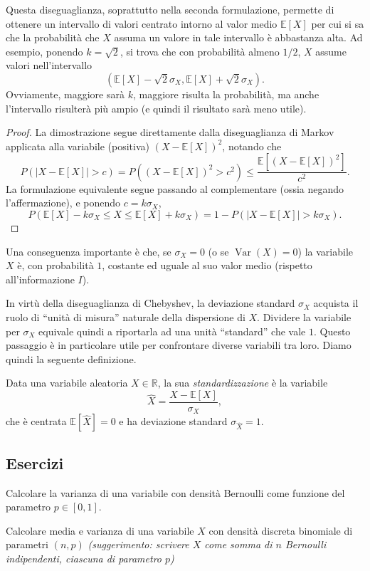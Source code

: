 \documentclass[
  italian,
  letterpaper,
]{book}
\newcommand{\bra}[1]{\left( #1 \right)}
\newcommand{\sqa}[1]{\left[ #1 \right]}
\newcommand{\R}{\mathbb{R}}
\newcommand{\E}[1]{\mathbb{E}\sqa{#1}}
\newcommand{\Var}[1]{\operatorname{Var}\bra{#1}}
\theoremstyle{definition}
\theoremstyle{remark}
\begin{document}
Questa diseguaglianza, soprattutto nella seconda formulazione, permette
di ottenere un intervallo di valori centrato intorno al valor medio
\(\E{X}\) per cui si sa che la probabilità che \(X\) assuma un valore in
tale intervallo è abbastanza alta. Ad esempio, ponendo \(k=\sqrt{2}\),
si trova che con probabilità almeno \(1/2\), \(X\) assume valori
nell'intervallo
\[ ( \E{X}- \sqrt{2} \sigma_X,  \E{X}+ \sqrt{2} \sigma_X).\] Ovviamente,
maggiore sarà \(k\), maggiore risulta la probabilità, ma anche
l'intervallo risulterà più ampio (e quindi il risultato sarà meno
utile).

\begin{proof}
La dimostrazione segue direttamente dalla diseguaglianza di Markov
applicata alla variabile (positiva) \((X-\E{X})^2\), notando che
\[ P( |X- \E{X}| > c ) =  P( (X- \E{X})^2 > c^2 ) \le \frac{ \E{(X- \E{X})^2}}{c^2}.\]
La formulazione equivalente segue passando al complementare (ossia
negando l'affermazione), e ponendo \(c = k \sigma_X\),
\[ P( \E{X}- k \sigma_X \le X \le \E{X}+ k \sigma_X) = 1-P( |X- \E{X}| > k\sigma_X ). \]
\end{proof}

Una conseguenza importante è che, se \(\sigma_X=0\) (o se \(\Var{X}=0\))
la variabile \(X\) è, con probabilità \(1\), costante ed uguale al suo
valor medio (rispetto all'informazione \(I\)).

In virtù della diseguaglianza di Chebyshev, la deviazione standard
\(\sigma_X\) acquista il ruolo di ``unità di misura'' naturale della
dispersione di \(X\). Dividere la variabile per \(\sigma_X\) equivale
quindi a riportarla ad una unità ``standard'' che vale \(1\). Questo
passaggio è in particolare utile per confrontare diverse variabili tra
loro. Diamo quindi la seguente definizione.

Data una variabile aleatoria \(X \in \R\), la sua
\emph{standardizzazione} è la variabile
\[ \hat{X} = \frac{ X- \E{X} }{\sigma_X},\] che è centrata
\(\E{\hat{X}} = 0\) e ha deviazione standard \(\sigma_{\hat{X}} =1\).

\subsection{Esercizi}\label{esercizi-20}

Calcolare la varianza di una variabile con densità Bernoulli come
funzione del parametro \(p \in [0,1]\).

Calcolare media e varianza di una variabile \(X\) con densità discreta
binomiale di parametri \((n,p)\) \emph{(suggerimento: scrivere \(X\)
come somma di \(n\) Bernoulli indipendenti, ciascuna di parametro
\(p\))}
\end{document}
